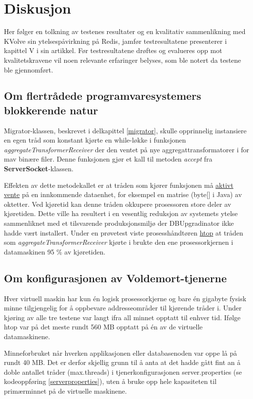 \section{Diskusjon}

Her følger en tolkning av testenes resultater og en kvalitativ sammenlikning med KVolve sin ytelsespåvirkning på Redis, jamfør testresultatene \cite{saur2016} presenterer i kapittel V i sin artikkel. Før testresultatene drøftes og evalueres opp mot kvalitetskravene vil noen relevante erfaringer belyses, som ble notert da testene ble gjennomført.

\subsection{Om flertrådede programvaresystemers blokkerende natur}

Migrator-klassen, beskrevet i delkapittel \ref{migrator}, skulle opprinnelig instansiere en egen tråd som konstant kjørte en while-løkke i funksjonen \emph{aggregateTransformerReceiver} der den ventet på nye aggregattransformatorer i for mav binære filer. Denne funksjonen gjør et kall til metoden \emph{accept} fra \textbf{ServerSocket}-klassen.

Effekten av dette metodekallet er at tråden som kjører funksjonen må \underline{aktivt vente} på en innkommende dataenhet, for eksempel en matrise (byte[] i Java) av oktetter. Ved kjøretid kan denne tråden okkupere prosessoren store deler av kjøretiden. Dette ville ha resultert i en vesentlig reduksjon av systemets ytelse sammenliknet med et tilsvarende produksjonsmiljø der DBUpgradinator ikke hadde vært installert. Under en prøvetest viste prosesshåndtøren \underline{htop} at tråden som \emph{aggregateTransformerReceiver} kjørte i brukte den ene prosessorkjernen i datamaskinen 95 \% av kjøretiden.

\subsection{Om konfigurasjonen av Voldemort-tjenerne}

Hver virtuell maskin har kun én logisk prosessorkjerne og bare én gigabyte fysisk minne tilgjengelig for å oppbevare addresseområder til kjørende tråder i. Under kjøring av alle tre testene var langt ifra all minnet opptatt til enhver tid. Ifølge htop var på det meste rundt 560 MB opptatt på én av de virtuelle datamaskinene.

Minneforbruket når hverken applikasjonen eller databasenoden var oppe lå på rundt 40 MB. Det er derfor skjellig grunn til å anta at det hadde gått fint an å doble antallet tråder (max.threads) i tjenerkonfigurasjonen server.properties (se kodeoppføring \ref{serverproperties}), uten å bruke opp hele kapasiteten til primærminnet på de virtuelle maskinene.

